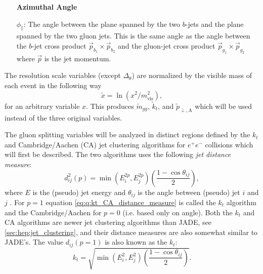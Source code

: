 {\begin{enumerate}[leftmargin=*,labelindent=40pt]
  \item[] \textbf{Azimuthal Angle} 
  \item[$\phi_\mathrm{\parallel}$:]  The angle between the plane spanned by the two $b$-jets and the plane spanned by the two gluon jets. This is the same angle as the angle between the $b$-jet cross product $\vec{p}_{b_1} \times \vec{p}_{b_2}$ and the gluon-jet cross product $\vec{p}_{g_1} \times \vec{p}_{g_2}$ where $\vec{p}$ is the jet momentum.

\end{enumerate}
}

The resolution scale variables (except $\Delta_\theta$) are normalized by the visible mass of each event in the following way 
\begin{equation}
  \tilde{x} = \ln(x^2 / m_\mathrm{vis}^2),
\end{equation}
for an arbitrary variable $x$. This produces $\tilde{m}_{gg}$, $\tilde{k}_t$, and $\tilde{p}_{\perp,\mathrm{A}}$ which will be used instead of the three original variables. 

The gluon splitting variables will be analyzed in distinct regions defined by the $k_t$ \citep{cataniLongitudinallyinvariantKtclusteringAlgorithms1993,ellisSuccessiveCombinationJet1993} and Cambridge/Aachen (CA) \citep{dokshitzerBetterJetClustering1997,wobischHadronizationCorrectionsJet1999} jet clustering algorithms for $e^+e^-$ collisions which will first be described. The two algorithms uses the following \emph{jet distance measure}:
\begin{equation}
  \label{eq:q:kt_CA_distance_measure}
  d_{ij}^2(p) = \min \left(E_i^{2p}, E_j^{2p} \right) \left(\frac{1-\cos \theta_{ij}}{2} \right), 
\end{equation}
where $E$ is the (pseudo) jet energy and $\theta_{ij}$ is the angle between (pseudo) jet $i$ and $j$ \autocite{cacciariFastJetUserManual2012}. For $p=1$ equation \eqref{eq:q:kt_CA_distance_measure} is called the $k_t$ algorithm and the Cambridge/Aachen for $p=0$ (i.e. based only on angle). Both the $k_t$ and CA algorithms are newer jet clustering algorithms than JADE, see \autoref{sec:hep:jet_clustering}, and their distance measures are also somewhat similar to JADE's. The value $d_{ij}(p=1)$ is also known as the $k_t$:
\begin{equation}
  \label{eq:q:k_t_definition_kt}
  k_t = \sqrt{\min \left(E_i^2, E_j^2 \right) \left(\frac{1-\cos \theta_{ij}}{2} \right)}.
\end{equation}

